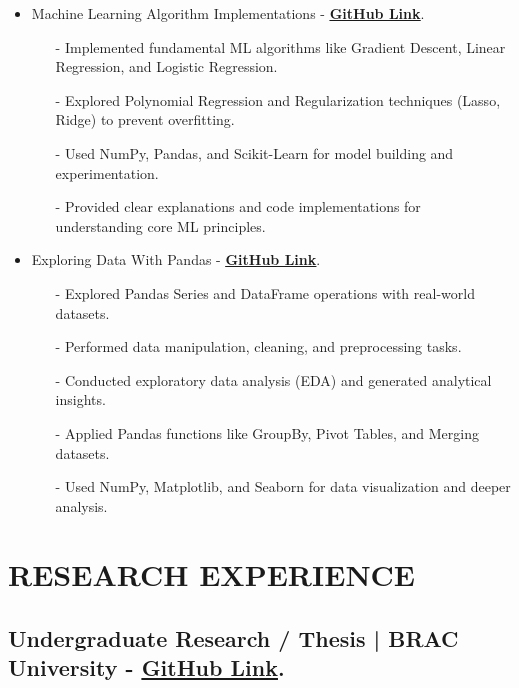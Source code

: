 \documentclass[letterpaper,11pt]{article}
\begin{document}
\begin{itemize}[left=0cm]
    \item Machine Learning Algorithm Implementations - \href{https://github.com/YOUR_GITHUB_LINK}{\underline{\textbf{GitHub Link}}}.
    \begin{itemize}[left=0cm]
        \item[-] \small \justifying Implemented fundamental ML algorithms like Gradient Descent, Linear Regression, and Logistic Regression.
        \item[-] \small \justifying Explored Polynomial Regression and Regularization techniques (Lasso, Ridge) to prevent overfitting.
        \item[-] \small \justifying Used NumPy, Pandas, and Scikit-Learn for model building and experimentation.
        \item[-] \small \justifying Provided clear explanations and code implementations for understanding core ML principles.
    \end{itemize}

    \item Exploring Data With Pandas - \href{https://github.com/ShahidulHaqueShaheeen/Exploring-Data-with-Pandas.git}{\underline{\textbf{GitHub Link}}}.
    \begin{itemize}[left=0cm]
        \item[-] \small \justifying Explored Pandas Series and DataFrame operations with real-world datasets.
        \item[-] \small \justifying Performed data manipulation, cleaning, and preprocessing tasks.
        \item[-] \small \justifying Conducted exploratory data analysis (EDA) and generated analytical insights.
        \item[-] \small \justifying Applied Pandas functions like GroupBy, Pivot Tables, and Merging datasets.
        \item[-] \small \justifying Used NumPy, Matplotlib, and Seaborn for data visualization and deeper analysis.
    \end{itemize}

\end{itemize}



\section*{\textbf{RESEARCH EXPERIENCE}}
\subsection*{Undergraduate Research / Thesis | BRAC University - 
 \href{https://github.com/ShahidulHaqueShaheeen/Research_Thesis.git}{\underline{\textbf{GitHub Link}}}.}
\end{document}
